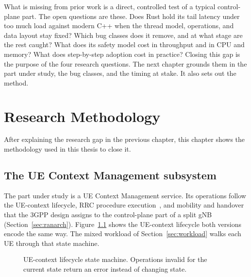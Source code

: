 \documentclass[english,oneside,a4paper,censored,csm,software-track-2020]{HYthesisML}
\begin{document}
What is missing from prior work is a direct, controlled test of a typical
control-plane part. The open questions are these. Does Rust hold its tail
latency under too much load against modern C++ when the thread model, operations, and
data layout stay fixed? Which bug classes does it remove, and at what stage
are the rest caught? What does its safety model cost in throughput and in CPU
and memory? What does step-by-step adoption cost in practice? Closing this gap
is the purpose of the four research questions. The next chapter grounds them
in the part under study, the bug classes, and the timing at stake. It also
sets out the method.


\chapter{Research Methodology\label{chapter:methodology}}

After explaining the research gap in the previous chapter, 
this chapter shows the methodology used in this thesis to close it.

\section{The UE Context Management subsystem}\label{sec:uecm}
The part under study is a UE Context Management service. Its operations follow the
UE-context lifecycle, RRC procedure execution~\cite{3gpp38331}, and mobility and
handover that the 3GPP design assigns to the control-plane part of a split gNB
(Section~\ref{sec:ranarch}). Figure~\ref{fig:fsm} shows the UE-context
lifecycle both versions encode the same way. The mixed workload of
Section~\ref{sec:workload} walks each UE through that state machine.

\begin{figure}[ht]
\centering
{}
\caption[UE-context lifecycle state machine]{UE-context lifecycle state machine.
Operations invalid for the current state return an error instead of changing
state.\label{fig:fsm}}
\end{figure}
\end{document}

